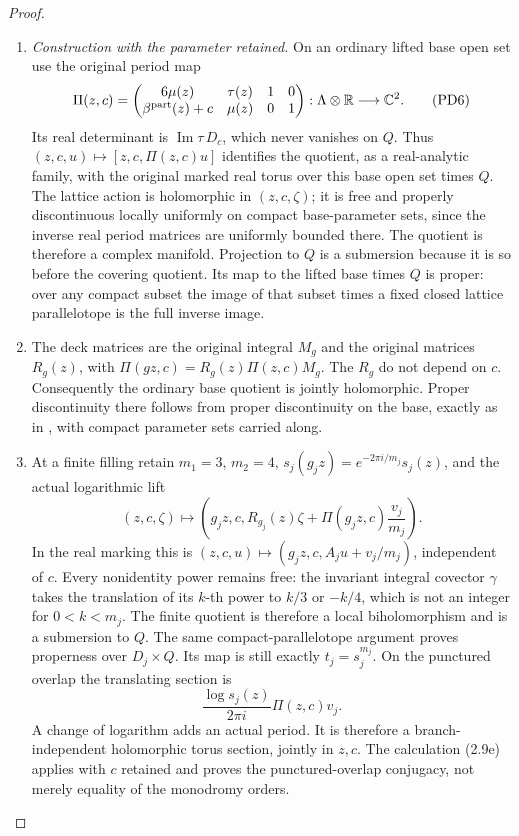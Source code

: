 \begin{proof}
\begin{enumerate}[label=\arabic*.,leftmargin=*]
\item \emph{Construction with the parameter retained.}
On an ordinary lifted base open set use the original period map
\[
 \Pi(z,c)=
 \begin{pmatrix}
 6\mu(z)&\tau(z)&1&0\\
 \beta^{\rm part}(z)+c&\mu(z)&0&1
 \end{pmatrix}:
 \Lambda\otimes\mathbb R\longrightarrow\mathbb C^2.
 \tag{PD6}
\]
Its real determinant is $\operatorname{Im}\tau\,D_c$, which never
vanishes on $Q$. Thus $(z,c,u)\mapsto[z,c,\Pi(z,c)u]$ identifies the
quotient, as a real-analytic family, with the original marked real torus
over this base open set times $Q$. The lattice action is holomorphic in
$(z,c,\zeta)$; it is free and properly discontinuous locally uniformly
on compact base-parameter sets, since the inverse real period matrices
are uniformly bounded there. The quotient is therefore a complex
manifold. Projection to $Q$ is a submersion because it is so before
the covering quotient. Its map to the lifted base times $Q$ is proper:
over any compact subset the image of that subset times a fixed closed
lattice parallelotope is the full inverse image.

\item The deck matrices are the original integral $M_g$ and the original
matrices $R_g(z)$, with
$\Pi(gz,c)=R_g(z)\Pi(z,c)M_g$. The $R_g$ do not depend on $c$.
Consequently the ordinary base quotient is jointly holomorphic.
Proper discontinuity there follows from proper discontinuity on the
base, exactly as in , with compact
parameter sets carried along.

\item At a finite filling retain $m_1=3$, $m_2=4$,
$s_j(g_jz)=e^{-2\pi i/m_j}s_j(z)$, and the actual logarithmic lift
\[
 (z,c,\zeta)\longmapsto
 \left(g_jz,c,R_{g_j}(z)\zeta+
                  \Pi(g_jz,c)\frac{v_j}{m_j}\right).
 \tag{PD7}
\]
In the real marking this is $(z,c,u)\mapsto
(g_jz,c,A_ju+v_j/m_j)$, independent of $c$.
Every nonidentity power remains free: the invariant integral covector
$\gamma$ takes the translation of its $k$-th power to $k/3$ or $-k/4$,
which is not an integer for $0<k<m_j$.
The finite quotient is therefore a local biholomorphism and is a
submersion to $Q$. The same compact-parallelotope argument proves
properness over $D_j\times Q$. Its map is still exactly
$t_j=s_j^{m_j}$. On the punctured overlap the translating section is
\[
 \frac{\log s_j(z)}{2\pi i}\Pi(z,c)v_j.
 \tag{PD8}
\]
A change of logarithm adds an actual period. It is therefore a
branch-independent holomorphic torus section, jointly in $z,c$.
The calculation (2.9e) applies with $c$ retained and proves the
punctured-overlap conjugacy, not merely equality of the monodromy orders.


\end{enumerate}
\end{proof}
